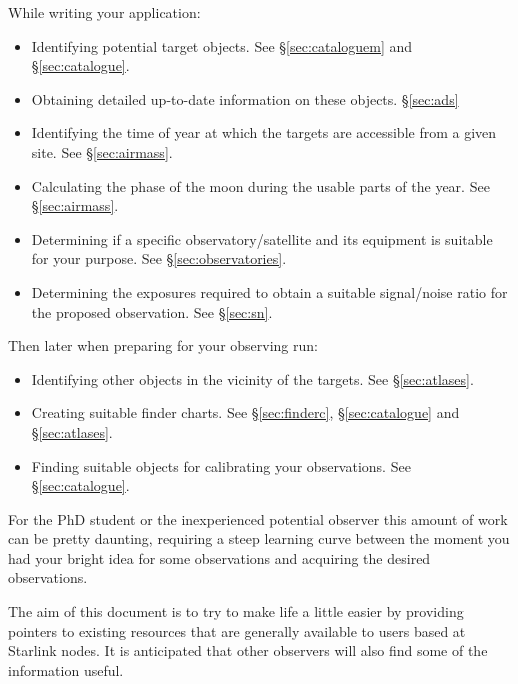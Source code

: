 \documentclass[twoside,11pt]{article}
\newcommand{\htmladdnormallink}[2]{#1}
\newcommand{\STARLINKref}{\htmladdnormallink{Starlink}{http://www.starlink.ac.uk/}}
\begin{document}
While writing your application:

\begin{itemize}
\item Identifying potential target objects. See \S{\ref{sec:cataloguem}} and \S{\ref{sec:catalogue}}.

\item Obtaining detailed up-to-date information on these objects. \S{\ref{sec:ads}}

\item Identifying the time of year at which the targets are accessible
      from a given site. See \S{\ref{sec:airmass}}.

\item Calculating the phase of the moon during the usable parts of the year. See
      \S{\ref{sec:airmass}}.

\item Determining if a specific observatory/satellite and its
      equipment is suitable for your purpose. See \S{\ref{sec:observatories}}.

\item Determining the exposures required to obtain
      a suitable signal/noise ratio for the proposed observation. See \S{\ref{sec:sn}}.

\end{itemize}

Then later when preparing for your observing run:

\begin{itemize}
\item Identifying other objects in the vicinity of the targets. See \S{\ref{sec:atlases}}.

\item Creating suitable finder charts. See \S{\ref{sec:finderc}}, \S{\ref{sec:catalogue}} and
      \S{\ref{sec:atlases}}.

\item Finding suitable objects for calibrating your observations. See \S{\ref{sec:catalogue}}.
\end{itemize}

For the PhD student or the inexperienced potential observer this amount of
work can be pretty daunting, requiring a steep learning curve between the
moment you had your bright idea for some observations and acquiring
the desired observations.

The aim of this document is to try to make life a little easier by
providing pointers to existing resources that are generally available
to users based at {\STARLINKref} nodes. It is anticipated that other
observers will also find some of the information useful.
\end{document}
